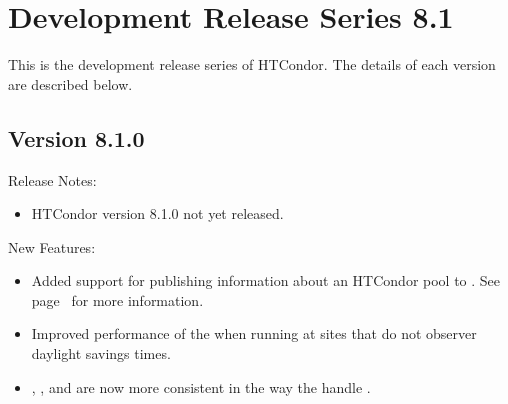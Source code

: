 
\section{\label{sec:History-8-1}Development Release Series 8.1}

This is the development release series of HTCondor.
The details of each version are described below.

\subsection*{\label{sec:New-8-1-0}Version 8.1.0}

\noindent Release Notes:

\begin{itemize}

\item HTCondor version 8.1.0 not yet released.

\end{itemize}


\noindent New Features:

\begin{itemize}

\item Added support for publishing information about an HTCondor pool to .
See page~\pageref{sec:Config-gangliad} for more information.

\item Improved performance of the  when running
at sites that do not observer daylight savings times.

\item {}, ,  and  are now more consistent
in the way the handle .

\end{itemize}

